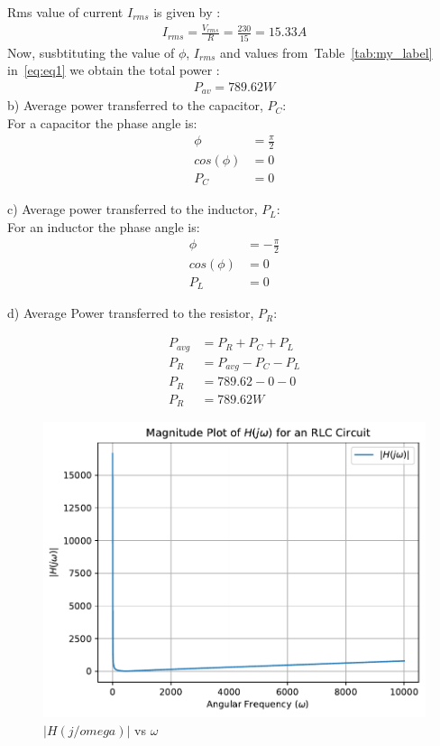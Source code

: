 \documentclass[journal,12pt,onecolumn]{IEEEtran}
\newcommand\tabref{Table~\ref}
\theoremstyle{remark}
\providecommand{\abs}[1]{\left\vert#1\right\vert}
\begin{document}
Rms value of current $I_{rms}$ is given by  :
\begin{align}
	I_{rms}=\frac{V_{rms}}{R}=\frac{230}{15}=15.33A
\end{align}
Now, susbtituting the value of $\phi$, $I_{rms}$ and values from~\tabref{tab:my_label} in~\eqref{eq:eq1} we obtain the total power :
\begin{align}
	P_{av}=789.62 W
\end{align}
b) Average power transferred to the capacitor, $P_C$:\\
For a capacitor the phase angle is:
\begin{align}
	\phi &= \frac{\pi}{2}\\
	cos(\phi) &= 0\\
	P_C &= 0
\end{align}	  

c) Average power transferred to the inductor, $P_L$:\\
For an inductor the phase angle is:
\begin{align}
	\phi &= -\frac{\pi}{2}\\
	cos(\phi) &= 0\\
	P_L &= 0
\end{align}	 

d) Average Power transferred to the resistor, $P_R$:

\begin{align}
	P_{avg} &= P_{R} + P_{C} + P_{L}\\
	P_{R} &= P_{avg} - P_{C} - P_{L}\\
	P_{R} &= 789.62 -0-0\\
	P_R &= 789.62W
\end{align}

\newpage
\begin{figure}[h!]
	\centering
	\includegraphics[width=\columnwidth]{figs/garph1.pdf}
	\caption{$\abs{H(j/omega)}$ vs $\omega$}
	\label{fig:magnitude_plot}
\end{figure}
\end{document}
